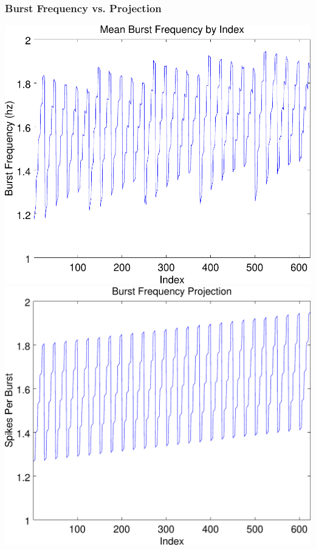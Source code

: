 \documentclass{beamer}
\theoremstyle{plain}
\theoremstyle{definition}
\begin{document}
\begin{frame}\frametitle{Burst Frequency vs. Projection}
  \begin{center}
    \includegraphics[scale=.32]{BurstFrequency.pdf}%
    \includegraphics[scale=.32]{BurstFrequencyProjection.pdf}
  \end{center}
\end{frame}

\end{document}
